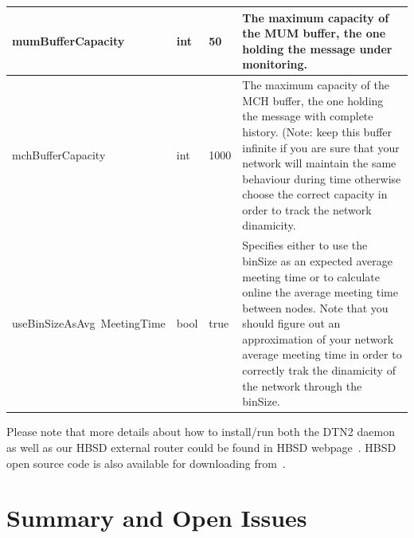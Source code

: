 \begin{longtable}[!h]{|p{4cm}|p{1cm}|p{2cm}|p{5cm}|}
\hline
mumBufferCapacity & int & 50& The maximum capacity of the MUM buffer, the one holding the message under monitoring. \\
\hline
mchBufferCapacity & int & 1000 & The maximum capacity of the MCH buffer, the one holding the message with complete history. 
(Note: keep this  buffer infinite if you are sure that your network will maintain the same behaviour during time otherwise choose the correct capacity in order to track the network dinamicity.\\
\hline
useBinSizeAsAvg\ MeetingTime & bool & true& Specifies either to use the binSize as an expected average meeting time or to calculate online the average meeting time between nodes. Note that you should figure out an approximation of your network average meeting time in order to correctly trak the dinamicity of the network  through the binSize.\\
\hline
\end{longtable}

Please note that more details about how to install/run both the DTN2 daemon as well as our HBSD external router could be found in HBSD webpage~\cite{HBSDDTN2}. HBSD open source code is also available for downloading from~\cite{HBSDDTN2}. 

\section{Summary and Open Issues}

